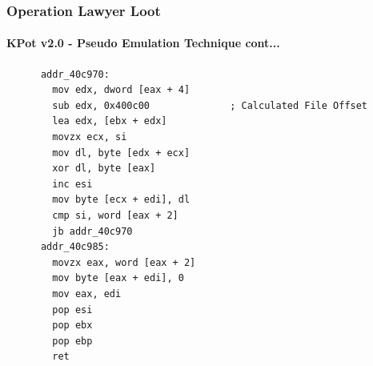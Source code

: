 \documentclass[aspectratio=169]{beamer}
\begin{document}
{
\begin{frame}[fragile]{}
  \frametitle{Operation Lawyer Loot}
  \framesubtitle{KPot v2.0 - Pseudo Emulation Technique cont...}
  \begin{tcolorbox}[title=KPot v2.0 - String Decryptor Pseudo Emulation Code Cont...,colback=black]
    \begin{verbatim}
      addr_40c970:
        mov edx, dword [eax + 4]
        sub edx, 0x400c00              ; Calculated File Offset
        lea edx, [ebx + edx]
        movzx ecx, si
        mov dl, byte [edx + ecx]
        xor dl, byte [eax]
        inc esi
        mov byte [ecx + edi], dl
        cmp si, word [eax + 2]
        jb addr_40c970
      addr_40c985:
        movzx eax, word [eax + 2]
        mov byte [eax + edi], 0
        mov eax, edi
        pop esi
        pop ebx
        pop ebp
        ret
    \end{verbatim}
  \end{tcolorbox}
\end{frame}
}
\end{document}
